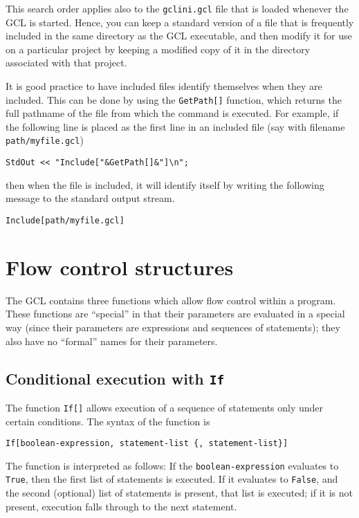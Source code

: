 This search order applies also to the \verb+gclini.gcl+ file that is
loaded whenever the GCL is started.  Hence, you can keep a standard
version of a file that is frequently included in the same directory as
the GCL executable, and then modify it for use on a particular project
by keeping a modified copy of it in the directory associated with that
project.  

It is good practice to have included files identify themselves when
they are included. This can be done by using the \verb+GetPath[]+
function, which returns the full pathname of the file from which the
command is executed.  For example, if the following line is placed as
the first line in an included file (say with filename
\verb+path/myfile.gcl+)

\begin{verbatim}
StdOut << "Include["&GetPath[]&"]\n";
\end{verbatim}

\noindent
then when the file is included, it will identify itself by writing
the following message to the standard output stream.  

\begin{verbatim}
Include[path/myfile.gcl]
\end{verbatim}


\section{Flow control structures}

The GCL contains three functions which allow flow control within a
program.  These functions are ``special'' in that their parameters are
evaluated in a special way (since their parameters are expressions and
sequences of statements); they also have no ``formal'' names for their
parameters.

\subsection{Conditional execution with {\tt If}}

The function \verb+If[]+ allows execution of a sequence of statements
only under certain conditions.  The syntax of the function is

\begin{verbatim}
If[boolean-expression, statement-list {, statement-list}]
\end{verbatim}

\noindent The function is interpreted as follows: If the
\verb+boolean-expression+ evaluates to \verb+True+, then the first
list of statements is executed.  If it evaluates to \verb+False+, and
the second (optional) list of statements is present, that list is
executed; if it is not present, execution falls through to the next
statement.


